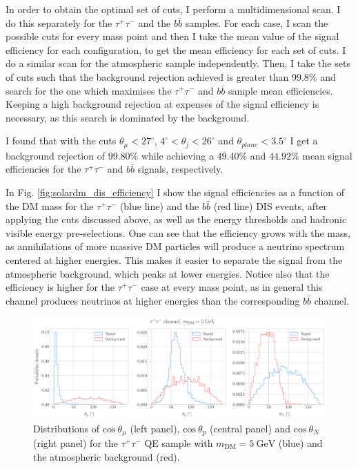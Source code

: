 In order to obtain the optimal set of cuts, I perform a multidimensional scan. I do this separately for the $\tau^{+} \tau^{-}$ and the $b\bar{b}$ samples. For each case, I scan the possible cuts for every mass point and then I take the mean value of the signal efficiency for each configuration, to get the mean efficiency for each set of cuts. I do a similar scan for the atmospheric sample independently. Then, I take the sets of cuts such that the background rejection achieved is greater than $99.8\%$ and search for the one which maximises the $\tau^{+} \tau^{-}$ and $b\bar{b}$ sample mean efficiencies. Keeping a high background rejection at expenses of the signal efficiency is necessary, as this search is dominated by the background.

I found that with the cuts $\theta_{\mu} < 27^{\circ}$, $4^{\circ} < \theta_{j} < 26^{\circ}$ and $\theta_{plane} < 3.5^{\circ}$ I get a background rejection of $99.80\%$ while achieving a $49.40\%$ and $44.92\%$ mean signal efficiencies for the $\tau^{+} \tau^{-}$ and $b\bar{b}$ signals, respectively.

In Fig. \ref{fig:solardm_dis_efficiency} I show the signal efficiencies as a function of the DM mass for the $\tau^{+} \tau^{-}$ (blue line) and the $b\bar{b}$ (red line) DIS events, after applying the cuts discussed above, as well as the energy thresholds and hadronic visible energy pre-selections. One can see that the efficiency grows with the mass, as annihilations of more massive DM particles will produce a neutrino spectrum centered at higher energies. This makes it easier to separate the signal from the atmospheric background, which peaks at lower energies. Notice also that the efficiency is higher for the $\tau^{+} \tau^{-}$ case at every mass point, as in general this channel produces neutrinos at higher energies than the corresponding $b\bar{b}$ channel.

\begin{figure}[t]
	\centering
	\includegraphics[width=0.95\linewidth]{Images/DM_Analysis/solardm_tau_5_qel_angular_dists.pdf}
	\caption[Angular distributions for the $\tau^{+}\tau^{-}$ QE sample with $m_{\mathrm{DM}} = 5 \ \mathrm{GeV}$ and the atmospheric background.]{Distributions of $\mathrm{cos} \ \theta_{\mu}$ (left panel), $\mathrm{cos} \ \theta_{p}$ (central panel) and $\mathrm{cos} \ \theta_{N}$ (right panel) for the $\tau^{+}\tau^{-}$ QE sample with $m_{\mathrm{DM}} = 5 \ \mathrm{GeV}$ (blue) and the atmospheric background (red).}
	\label{fig:solardm_tau_5_qel_angular_dists}
\end{figure}


